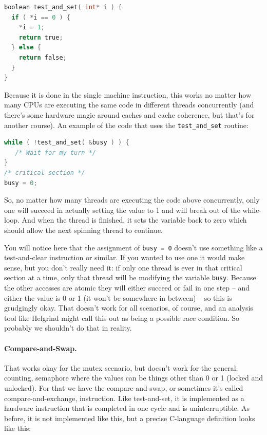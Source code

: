 \begin{lstlisting}[language=C]
boolean test_and_set( int* i ) {
  if ( *i == 0 ) {
    *i = 1;
    return true;
  } else {
    return false;
  }
}
\end{lstlisting}

Because it is done in the single machine instruction, this works no matter how many CPUs are executing the same code in different threads concurrently (and there's some hardware magic around caches and cache coherence, but that's for another course). An example of the code that uses the \texttt{test\_and\_set} routine:

\begin{lstlisting}[language=C]
while ( !test_and_set( &busy ) ) {
   /* Wait for my turn */
}
/* critical section */
busy = 0;
\end{lstlisting}

So, no matter how many threads are executing the code above concurrently, only one will succeed in actually setting the value to 1 and will break out of the while-loop. And when the thread is finished, it sets the variable back to zero which should allow the next spinning thread to continue.

You will notice here that the assignment of \texttt{busy = 0} doesn't use something like a test-and-clear instruction or similar. If you wanted to use one it would make sense, but you don't really need it: if only one thread is ever in that critical section at a time, only that thread will be modifying the variable \texttt{busy}. Because the other accesses are atomic they will either succeed or fail in one step -- and either the value is 0 or 1 (it won't be somewhere in between) -- so this is grudgingly okay. That doesn't work for all scenarios, of course, and an analysis tool like Helgrind might call this out as being a possible race condition. So probably we shouldn't do that in reality.

\paragraph{Compare-and-Swap.} That works okay for the mutex scenario, but doesn't work for the general, counting, semaphore where the values can be things other than 0 or 1 (locked and unlocked). For that we have the compare-and-swap, or sometimes it's called compare-and-exchange, instruction. Like test-and-set, it is implemented as a hardware instruction that is completed in one cycle and is uninterruptible. As before, it is not implemented like this, but a precise C-language definition looks like this:

